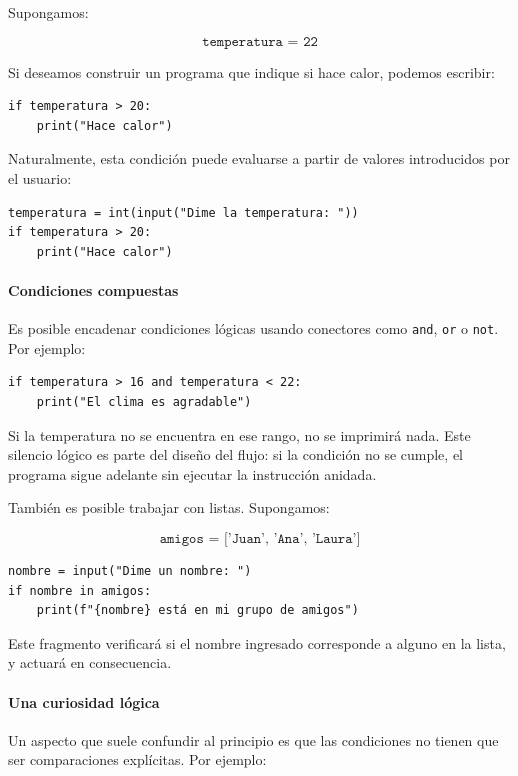 \documentclass{article}
\theoremstyle{nonumberplain}
\begin{document}
Supongamos:

\[
\texttt{temperatura = 22}
\]

Si deseamos construir un programa que indique si hace calor, podemos escribir:

\begin{verbatim}
if temperatura > 20:
    print("Hace calor")
\end{verbatim}

Naturalmente, esta condición puede evaluarse a partir de valores introducidos por el usuario:

\begin{verbatim}
temperatura = int(input("Dime la temperatura: "))
if temperatura > 20:
    print("Hace calor")
\end{verbatim}

\paragraph{Condiciones compuestas}

Es posible encadenar condiciones lógicas usando conectores como \texttt{and}, \texttt{or} o \texttt{not}. Por ejemplo:

\begin{verbatim}
if temperatura > 16 and temperatura < 22:
    print("El clima es agradable")
\end{verbatim}

Si la temperatura no se encuentra en ese rango, no se imprimirá nada. Este silencio lógico es parte del diseño del flujo: si la condición no se cumple, el programa sigue adelante sin ejecutar la instrucción anidada.

También es posible trabajar con listas. Supongamos:

\[
\texttt{amigos = ['Juan', 'Ana', 'Laura']}
\]

\begin{verbatim}
nombre = input("Dime un nombre: ")
if nombre in amigos:
    print(f"{nombre} está en mi grupo de amigos")
\end{verbatim}

Este fragmento verificará si el nombre ingresado corresponde a alguno en la lista, y actuará en consecuencia.

\paragraph{Una curiosidad lógica}

Un aspecto que suele confundir al principio es que las condiciones no tienen que ser comparaciones explícitas. Por ejemplo:
\end{document}
